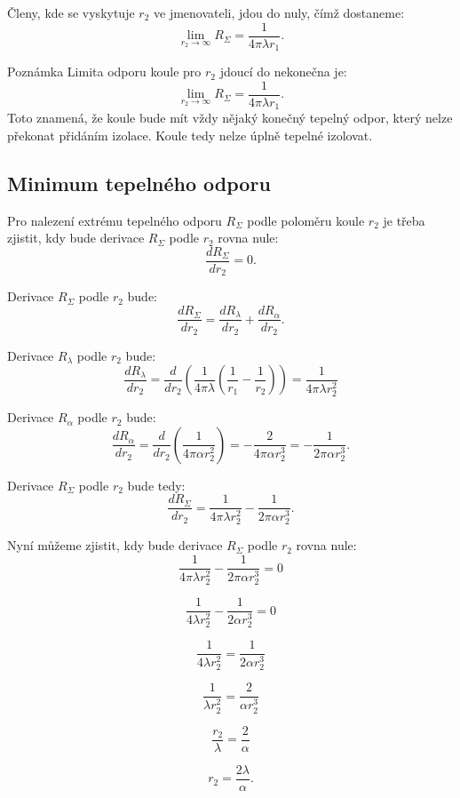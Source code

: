 \documentclass{article}
\begin{document}
Členy, kde se vyskytuje $r_2$ ve jmenovateli, jdou do nuly, čímž dostaneme:
$$
    \lim_{r_2 \to \infty} R_\Sigma = \frac{1}{4 \pi \lambda r_1}.
$$

\begin{notebox}{Poznámka}
    Limita odporu koule pro $r_2$ jdoucí do nekonečna je:
    $$
        \lim_{r_2 \to \infty} R_\Sigma = \frac{1}{4 \pi \lambda r_1}.
    $$
    Toto znamená, že koule bude mít vždy nějaký konečný tepelný odpor, který nelze překonat přidáním izolace. Koule tedy nelze úplně tepelné izolovat.
\end{notebox}



\subsection{Minimum tepelného odporu}
Pro nalezení extrému tepelného odporu $R_\Sigma$ podle poloměru koule $r_2$ je třeba zjistit, kdy bude derivace $R_\Sigma$ podle $r_2$ rovna nule:
$$
    \frac{dR_\Sigma}{dr_2} = 0.
$$

Derivace $R_\Sigma$ podle $r_2$ bude:
$$
    \frac{dR_\Sigma}{dr_2} = \frac{dR_\lambda}{dr_2} + \frac{dR_\alpha}{dr_2}.
$$

Derivace $R_\lambda$ podle $r_2$ bude:
$$
    \frac{dR_\lambda}{dr_2} = \frac{d}{dr_2} \left( \frac{1}{4 \pi \lambda} \left( \frac{1}{r_1} - \frac{1}{r_2} \right) \right) = \frac{1}{4 \pi \lambda r_2^2}
$$

Derivace $R_\alpha$ podle $r_2$ bude:
$$
    \frac{dR_\alpha}{dr_2} = \frac{d}{dr_2} \left( \frac{1}{4 \pi \alpha r_2^2} \right) = -\frac{2}{4 \pi \alpha r_2^3} = -\frac{1}{2 \pi \alpha r_2^3}.
$$

Derivace $R_\Sigma$ podle $r_2$ bude tedy:
$$
    \frac{dR_\Sigma}{dr_2} = \frac{1}{4 \pi \lambda r_2^2} - \frac{1}{2 \pi \alpha r_2^3}.
$$

Nyní můžeme zjistit, kdy bude derivace $R_\Sigma$ podle $r_2$ rovna nule:
$$
    \frac{1}{4 \pi \lambda r_2^2} - \frac{1}{2 \pi \alpha r_2^3} = 0
$$

$$
    \frac{1}{4 \lambda r_2^2} - \frac{1}{2 \alpha r_2^3} = 0
$$

$$
    \frac{1}{4 \lambda r_2^2} = \frac{1}{2 \alpha r_2^3}
$$

$$
    \frac{1}{\lambda r_2^2} = \frac{2}{\alpha r_2^3}
$$

$$
    \frac{r_2}{\lambda} = \frac{2}{\alpha}
$$

$$
    r_2 = \frac{2 \lambda}{\alpha}.
$$
\end{document}
